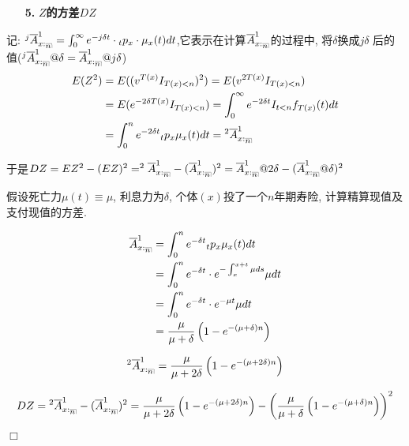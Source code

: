 \documentclass[a4paper,10pt]{ctexbook}
\makeatletter
\newcommand{\hei}{\CJKfamily{hei}}      %
\def\qed{\hfill$\Box$\medskip}
\DeclareRobustCommand{\annu}[1]{_{%
    \def\arraystretch{0}%
    \setlength\arraycolsep{1pt}%
    \setlength\arrayrulewidth{.2pt}%
    \begin{array}[b]{@{}c|}\hline
        \\[\arraycolsep]%
        \scriptstyle #1%
    \end{array}%
}}
\makeatother
\begin{document}
\begin{itemize}
    \item[{\bf\hei 5.}]{\bf\hei $Z$的方差$DZ$}
\end{itemize}

记: $^j\overline{A}_{x:\annu{n}}^1=\int_0^{\infty}{e^{-j\delta t}\cdot {}_tp_x\cdot \mu_{x}(t)dt}$,它表示在计算$\overline{A}_{x:\annu{n}}^1$的过程中, 将$\delta$换成$j\delta$ 后的值($^j\overline{A}_{x:\annu{n}}^1@\delta=\overline{A}_{x:\annu{n}}^1@j\delta$)
\begin{align*}
    E(Z^2) & =E((v^{T(x)}I_{T(x)<n})^2)=E(v^{2T(x)}I_{T(x)<n})                                   \\
           & =E(e^{-2\delta T(x)}I_{T(x)<n})=\int_0^{\infty}{e^{-2\delta t}I_{t<n}f_{T(x)}(t)dt} \\
           & =\int_0^n{e^{-2\delta t}{}_tp_x\mu_x(t)dt}={}^2\overline{A}_{x:\annu{n}}^1
\end{align*}

于是$DZ=EZ^2-(EZ)^2=^2\overline{A}_{x:\annu{n}}^1-(\overline{A}_{x:\annu{n}}^1)^2=\overline{A}_{x:\annu{n}}^1@2\delta-(\overline{A}_{x:\annu{n}}^1@\delta)^2$

\begin{example}
    假设死亡力$\mu(t) \equiv \mu $, 利息力为$\delta$, 个体$(x)$投了一个$n$年期寿险, 计算精算现值及支付现值的方差.
\end{example}

\solution
\begin{align*}
    \overline{A}_{x:\annu{n}}^1 & = \int_0^n{e^{-\delta t}{}_tp_x\mu_x(t)dt}                        \\
                                & = \int_0^n{e^{-\delta t}\cdot e^{-\int_{x}^{x+t} \mu ds}\mu dt}   \\
                                & = \int_0^n{e^{-\delta t}\cdot e^{-\mu t}\mu dt}                   \\
                                & = \frac{\mu}{\mu + \delta} \left(1 - e^{-(\mu + \delta)n} \right)
\end{align*}

\begin{align*}
    ^2\overline{A}_{x:\annu{n}}^1 = \frac{\mu}{\mu + 2\delta} \left(1 - e^{-(\mu + 2\delta)n} \right)
\end{align*}

\begin{align*}
    DZ = {}^2\overline{A}_{x:\annu{n}}^1 - (\overline{A}_{x:\annu{n}}^1)^2 = \frac{\mu}{\mu + 2\delta} \left(1 - e^{-(\mu + 2\delta)n} \right) - \left(\frac{\mu}{\mu + \delta} \left(1 - e^{-(\mu + \delta)n} \right)\right)^2
\end{align*}
\qed
\end{document}
